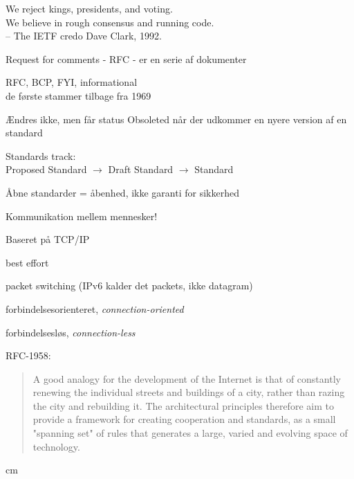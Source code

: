\documentclass[Screen16to9,17pt]{foils}
\begin{document}

{\hlkbig \color{titlecolor}
We reject kings, presidents, and voting.\\
We believe in rough consensus and running code.\\
-- The IETF credo Dave Clark, 1992.}

\begin{list1}
\item Request for comments - RFC - er en serie af dokumenter
\item RFC, BCP, FYI, informational\\
de første stammer tilbage fra 1969
\item Ændres ikke, men får status Obsoleted når der udkommer en nyere
  version af en standard
\item Standards track:\\
Proposed Standard $\rightarrow$ Draft Standard $\rightarrow$ Standard
\item  Åbne standarder = åbenhed, ikke garanti for sikkerhed
\end{list1}


\begin{list1}
\item Kommunikation mellem mennesker!
\item Baseret på TCP/IP
\begin{list2}
\item best effort
\item packet switching (IPv6 kalder det packets, ikke datagram)
\item forbindelsesorienteret, \emph{connection-oriented}
\item forbindelsesløs, \emph{connection-less}
\end{list2}
\end{list1}

RFC-1958:
\begin{quote}
 A good analogy for the development of the Internet is that of
 constantly renewing the individual streets and buildings of a city,
 rather than razing the city and rebuilding it. The architectural
 principles therefore aim to provide a framework for creating
 cooperation and standards, as a small "spanning set" of rules that
 generates a large, varied and evolving space of technology.
\end{quote}


 cm
\end{document}
